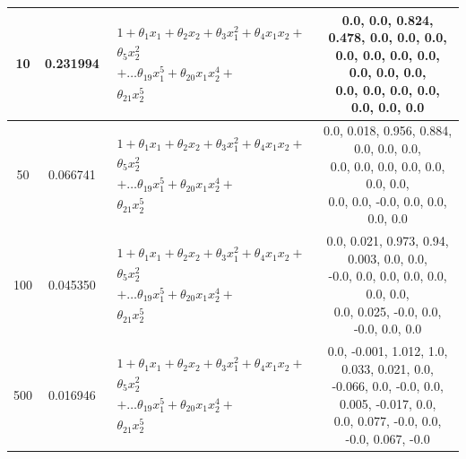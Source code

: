 \documentclass[10pt]{article}
\begin{document}
\begin{table}[H]
\begin{center}
\begin{tabular}{ |c|c|c|c| }
      \hline
      10   & 0.231994  & $\begin{aligned}1 + \theta_{1}x_{1} + \theta_{2}x_{2} + \theta_{3}x_{1}^{2}+ \theta_{4}x_{1}x_{2}+\\\nonumber \theta_{5}x_{2}^{2}\\\nonumber+\dots \theta_{19}x_{1}^{5}+ \theta_{20}x_{1}x_{2}^{4}+ \\\nonumber \theta_{21}x_{2}^{5}\end{aligned}$ & \makecell{0.0, 0.0, 0.824, 0.478, 0.0, 0.0, 0.0,        \\0.0, 0.0, 0.0, 0.0, 0.0, 0.0, 0.0, \\0.0, 0.0, 0.0, 0.0, 0.0, 0.0, 0.0} \\
      \hline
      50   & 0.066741  & $\begin{aligned}1 + \theta_{1}x_{1} + \theta_{2}x_{2} + \theta_{3}x_{1}^{2}+ \theta_{4}x_{1}x_{2}+\\\nonumber \theta_{5}x_{2}^{2}\\\nonumber+\dots \theta_{19}x_{1}^{5}+ \theta_{20}x_{1}x_{2}^{4}+ \\\nonumber \theta_{21}x_{2}^{5}\end{aligned}$ & \makecell{0.0, 0.018, 0.956, 0.884, 0.0, 0.0, 0.0,      \\0.0, 0.0, 0.0, 0.0, 0.0, 0.0, 0.0, \\0.0, 0.0, -0.0, 0.0, 0.0, 0.0, 0.0} \\
      \hline
      100  & 0.045350  & $\begin{aligned}1 + \theta_{1}x_{1} + \theta_{2}x_{2} + \theta_{3}x_{1}^{2}+ \theta_{4}x_{1}x_{2}+\\\nonumber \theta_{5}x_{2}^{2}\\\nonumber+\dots \theta_{19}x_{1}^{5}+ \theta_{20}x_{1}x_{2}^{4}+ \\\nonumber \theta_{21}x_{2}^{5}\end{aligned}$ & \makecell{0.0, 0.021, 0.973, 0.94, 0.003, 0.0, 0.0,     \\-0.0, 0.0, 0.0, 0.0, 0.0, 0.0, 0.0, \\0.0, 0.025, -0.0, 0.0, -0.0, 0.0, 0.0} \\
      \hline
      500  & 0.016946  & $\begin{aligned}1 + \theta_{1}x_{1} + \theta_{2}x_{2} + \theta_{3}x_{1}^{2}+ \theta_{4}x_{1}x_{2}+\\\nonumber \theta_{5}x_{2}^{2}\\\nonumber+\dots \theta_{19}x_{1}^{5}+ \theta_{20}x_{1}x_{2}^{4}+ \\\nonumber \theta_{21}x_{2}^{5}\end{aligned}$ & \makecell{0.0, -0.001, 1.012, 1.0, 0.033, 0.021, 0.0,   \\-0.066, 0.0, -0.0, 0.0, 0.005, -0.017, 0.0, \\0.0, 0.077, -0.0, 0.0, -0.0, 0.067, -0.0} \\

\end{tabular}
\end{center}
\end{table}
\end{document}
